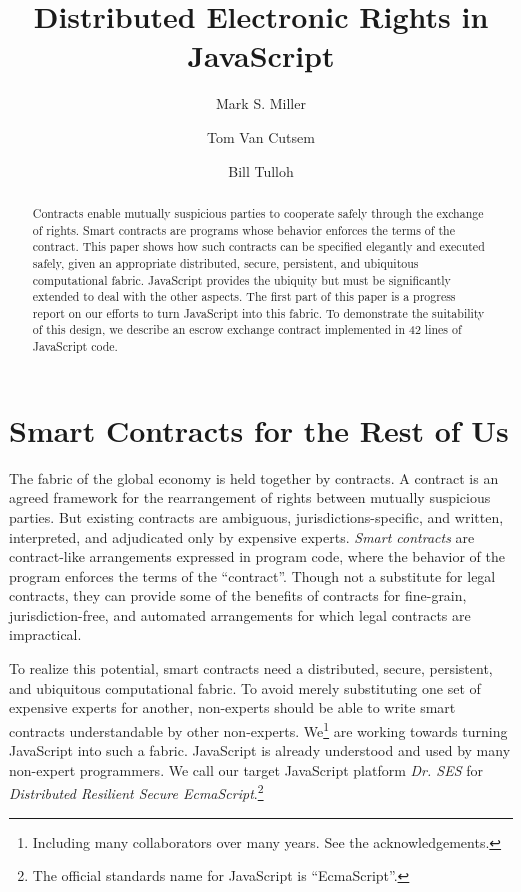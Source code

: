 \documentclass{llncs}
\begin{document}
\sloppypar


\title{Distributed Electronic Rights in JavaScript}

\author{Mark S. Miller \and Tom Van Cutsem \and Bill Tulloh }


\maketitle    

\begin{abstract}
Contracts enable mutually suspicious parties to cooperate safely through the exchange of rights. Smart contracts are programs whose behavior enforces the terms of the contract. This paper shows how such contracts can be specified elegantly and executed safely, given an appropriate distributed, secure, persistent, and ubiquitous computational fabric. JavaScript provides the ubiquity but must be significantly extended to deal with the other aspects. The first part of this paper is a progress report on our efforts to turn JavaScript into this fabric. To demonstrate the suitability of this design, we describe an escrow exchange contract implemented in 42 lines of JavaScript code.

\end{abstract}


\section{Smart Contracts for the Rest of Us}
\label{intro}

The fabric of the global economy is held together by contracts. A contract is an agreed framework for the rearrangement of rights between mutually suspicious parties. But existing contracts are ambiguous, jurisdictions-specific, and written, interpreted, and adjudicated only by expensive experts. \emph{Smart contracts} are contract-like arrangements expressed in program code, where the behavior of the program enforces the terms of the ``contract''\cite{szabo1997formalizing}. Though not a substitute for legal contracts, they can provide some of the benefits of contracts for fine-grain, jurisdiction-free, and automated arrangements for which legal contracts are impractical.

To realize this potential, smart contracts need a distributed, secure, persistent, and ubiquitous computational fabric. To avoid merely substituting one set of expensive experts for another, non-experts should be able to write smart contracts understandable by other non-experts. We\footnote{
%
Including many collaborators over many years. See the acknowledgements.
%
} are working towards turning JavaScript into such a fabric. JavaScript is already understood and used by many non-expert programmers. We call our target JavaScript platform \emph{Dr. SES} for \emph{Distributed Resilient Secure EcmaScript}.\footnote{
%
The official standards name for JavaScript is ``EcmaScript''.
%
} 
\end{document}
